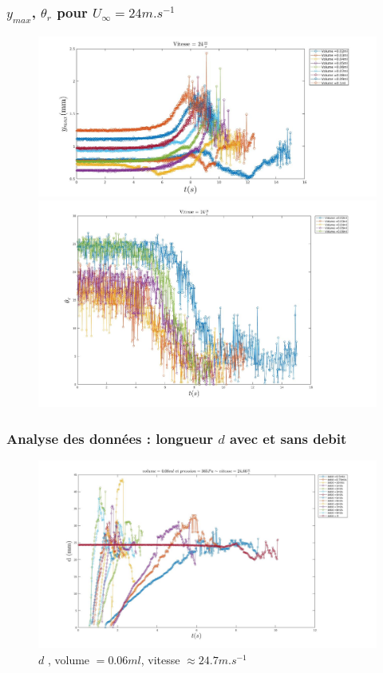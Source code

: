 \documentclass{beamer}
\begin{document}
\begin{frame}
	\frametitle{$y_{max}$, $\theta_{r}$ pour $U_{\infty}=24m.s^{-1}$}
\begin{figure}[!ht]
	\centering
	\begin{minipage}{0.5\linewidth}
		\includegraphics[width = \linewidth]{./image/v=24ym.jpg}
	\end{minipage}
	\vfill
	\begin{minipage}{0.5\linewidth}
	\includegraphics[width = \linewidth]{./image/v=24or_2.jpg}
	\end{minipage}
\end{figure}
\end{frame}

\begin{frame}
\frametitle{Analyse des données : longueur $d$ avec et sans debit}
\begin{figure}[!ht]
        \centering
	\includegraphics[width = \linewidth]{./image/p=365_vol=006d.jpg}
	\caption{$d$ , volume $= 0.06ml$, vitesse $\approx 24.7m.s^{-1}$}
\label{fig:p=365_vol=006d}
\end{figure}
\end{frame}
\end{document}
